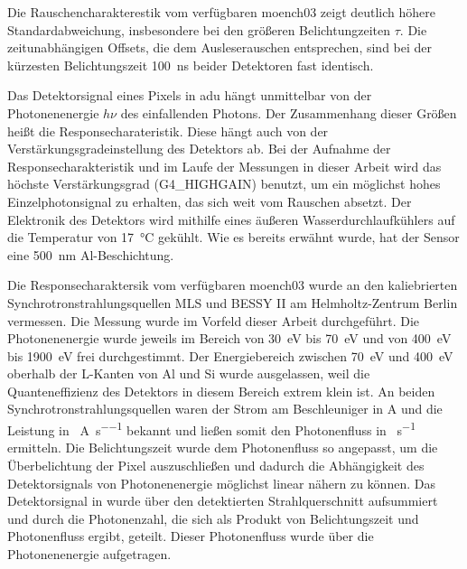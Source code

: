 \noindent
Die Rauschencharakterestik vom verfügbaren \gls{moench03} zeigt deutlich höhere Standardabweichung, insbesondere bei den größeren Belichtungzeiten $\tau$. Die zeitunabhängigen Offsets, die dem Ausleserauschen entsprechen, sind bei der kürzesten Belichtungszeit \SI{100}{\nano\second} beider Detektoren fast identisch.

\noindent
Das Detektorsignal eines Pixels in \gls{adu} hängt unmittelbar von der Photonenenergie $h\nu$ des einfallenden Photons. Der Zusammenhang dieser Größen heißt die Responsecharateristik. Diese hängt auch von der Verstärkungsgradeinstellung des Detektors ab. Bei der Aufnahme der Responsecharakteristik und im Laufe der Messungen in dieser Arbeit wird das höchste Verstärkungsgrad (G4\_HIGHGAIN) benutzt, um ein möglichst hohes Einzelphotonsignal zu erhalten, das sich weit vom Rauschen absetzt. Der Elektronik des Detektors wird mithilfe eines äußeren Wasserdurchlaufkühlers auf die Temperatur von \SI{17}{\celsius} gekühlt. Wie es bereits erwähnt wurde, hat der Sensor eine \SI{500}{\nano\meter} Al-Beschichtung.
%     

\noindent
Die Responsecharaktersik vom verfügbaren \gls{moench03} wurde an den kaliebrierten Synchrotronstrahlungsquellen MLS und BESSY II am Helmholtz-Zentrum Berlin vermessen. Die Messung wurde im Vorfeld dieser Arbeit durchgeführt. Die Photonenenergie wurde jeweils im Bereich von \SI{30}{\eV} bis \SI{70}{\eV} und von \SI{400}{\eV} bis \SI{1900}{\eV} frei durchgestimmt. Der Energiebereich zwischen \SI{70}{\eV} und \SI{400}{\eV} oberhalb der L-Kanten von Al und Si wurde ausgelassen, weil die Quanteneffizienz des Detektors in diesem Bereich extrem klein ist. An beiden Synchrotronstrahlungsquellen waren der Strom am Beschleuniger in \si{\ampere} und die Leistung in \si{\photons\per\ampere\per\second} bekannt und ließen somit den Photonenfluss in \si{\photons\per\second} ermitteln. Die Belichtungszeit wurde dem Photonenfluss so angepasst, um die Überbelichtung der Pixel auszuschließen und dadurch die Abhängigkeit des Detektorsignals von Photonenenergie möglichst linear nähern zu können. Das Detektorsignal in \si{\adu} wurde über den detektierten Strahlquerschnitt aufsummiert und durch die Photonenzahl, die sich als Produkt von Belichtungszeit und Photonenfluss ergibt, geteilt. Dieser Photonenfluss wurde über die Photonenenergie aufgetragen.

